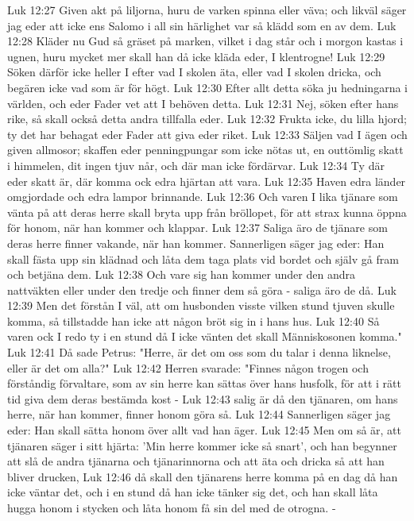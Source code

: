 Luk 12:27  Given akt på liljorna, huru de varken spinna eller väva; och likväl säger jag eder att icke ens Salomo i all sin härlighet var så klädd som en av dem.
Luk 12:28  Kläder nu Gud så gräset på marken, vilket i dag står och i morgon kastas i ugnen, huru mycket mer skall han då icke kläda eder, I klentrogne!
Luk 12:29  Söken därför icke heller I efter vad I skolen äta, eller vad I skolen dricka, och begären icke vad som är för högt.
Luk 12:30  Efter allt detta söka ju hedningarna i världen, och eder Fader vet att I behöven detta.
Luk 12:31  Nej, söken efter hans rike, så skall också detta andra tillfalla eder.
Luk 12:32  Frukta icke, du lilla hjord; ty det har behagat eder Fader att giva eder riket.
Luk 12:33  Säljen vad I ägen och given allmosor; skaffen eder penningpungar som icke nötas ut, en outtömlig skatt i himmelen, dit ingen tjuv når, och där man icke fördärvar.
Luk 12:34  Ty där eder skatt är, där komma ock edra hjärtan att vara.
Luk 12:35  Haven edra länder omgjordade och edra lampor brinnande.
Luk 12:36  Och varen I lika tjänare som vänta på att deras herre skall bryta upp från bröllopet, för att strax kunna öppna för honom, när han kommer och klappar.
Luk 12:37  Saliga äro de tjänare som deras herre finner vakande, när han kommer. Sannerligen säger jag eder: Han skall fästa upp sin klädnad och låta dem taga plats vid bordet och själv gå fram och betjäna dem.
Luk 12:38  Och vare sig han kommer under den andra nattväkten eller under den tredje och finner dem så göra - saliga äro de då.
Luk 12:39  Men det förstån I väl, att om husbonden visste vilken stund tjuven skulle komma, så tillstadde han icke att någon bröt sig in i hans hus.
Luk 12:40  Så varen ock I redo ty i en stund då I icke vänten det skall Människosonen komma."
Luk 12:41  Då sade Petrus: "Herre, är det om oss som du talar i denna liknelse, eller är det om alla?"
Luk 12:42  Herren svarade: "Finnes någon trogen och förståndig förvaltare, som av sin herre kan sättas över hans husfolk, för att i rätt tid giva dem deras bestämda kost -
Luk 12:43  salig är då den tjänaren, om hans herre, när han kommer, finner honom göra så.
Luk 12:44  Sannerligen säger jag eder: Han skall sätta honom över allt vad han äger.
Luk 12:45  Men om så är, att tjänaren säger i sitt hjärta: 'Min herre kommer icke så snart', och han begynner att slå de andra tjänarna och tjänarinnorna och att äta och dricka så att han bliver drucken,
Luk 12:46  då skall den tjänarens herre komma på en dag då han icke väntar det, och i en stund då han icke tänker sig det, och han skall låta hugga honom i stycken och låta honom få sin del med de otrogna. -
